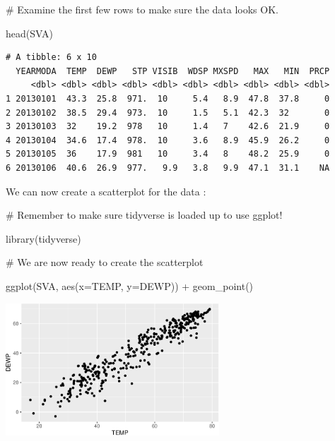 \documentclass[
  letterpaper,
  DIV=11,
  numbers=noendperiod]{scrreprt}
\newenvironment{Shaded}{\begin{snugshade}}{\end{snugshade}}
\newcommand{\AttributeTok}[1]{\textcolor[rgb]{0.40,0.45,0.13}{#1}}
\newcommand{\CommentTok}[1]{\textcolor[rgb]{0.37,0.37,0.37}{#1}}
\newcommand{\FunctionTok}[1]{\textcolor[rgb]{0.28,0.35,0.67}{#1}}
\newcommand{\NormalTok}[1]{\textcolor[rgb]{0.00,0.23,0.31}{#1}}
\newcommand{\SpecialCharTok}[1]{\textcolor[rgb]{0.37,0.37,0.37}{#1}}
\begin{document}
\begin{Shaded}
\begin{Highlighting}[]
\CommentTok{\# Examine the first few rows to make sure the data looks OK.}

\FunctionTok{head}\NormalTok{(SVA)}
\end{Highlighting}
\end{Shaded}

\begin{verbatim}
# A tibble: 6 x 10
  YEARMODA  TEMP  DEWP   STP VISIB  WDSP MXSPD   MAX   MIN  PRCP
     <dbl> <dbl> <dbl> <dbl> <dbl> <dbl> <dbl> <dbl> <dbl> <dbl>
1 20130101  43.3  25.8  971.  10     5.4   8.9  47.8  37.8     0
2 20130102  38.5  29.4  973.  10     1.5   5.1  42.3  32       0
3 20130103  32    19.2  978   10     1.4   7    42.6  21.9     0
4 20130104  34.6  17.4  978.  10     3.6   8.9  45.9  26.2     0
5 20130105  36    17.9  981   10     3.4   8    48.2  25.9     0
6 20130106  40.6  26.9  977.   9.9   3.8   9.9  47.1  31.1    NA
\end{verbatim}

We can now create a scatterplot for the data :

\begin{Shaded}
\begin{Highlighting}[]
\CommentTok{\# Remember to make sure tidyverse is loaded up to use ggplot! }

\FunctionTok{library}\NormalTok{(tidyverse)}
\end{Highlighting}
\end{Shaded}

\begin{Shaded}
\begin{Highlighting}[]
\CommentTok{\# We are now ready to create the scatterplot}

\FunctionTok{ggplot}\NormalTok{(SVA, }\FunctionTok{aes}\NormalTok{(}\AttributeTok{x=}\NormalTok{TEMP, }\AttributeTok{y=}\NormalTok{DEWP)) }\SpecialCharTok{+}
  \FunctionTok{geom\_point}\NormalTok{()}
\end{Highlighting}
\end{Shaded}

\begin{center}
\includegraphics[width=0.6\textwidth,height=\textheight]{Linear_Modeling_and_Regression_files/figure-pdf/unnamed-chunk-4-1.pdf}
\end{center}
\end{document}
